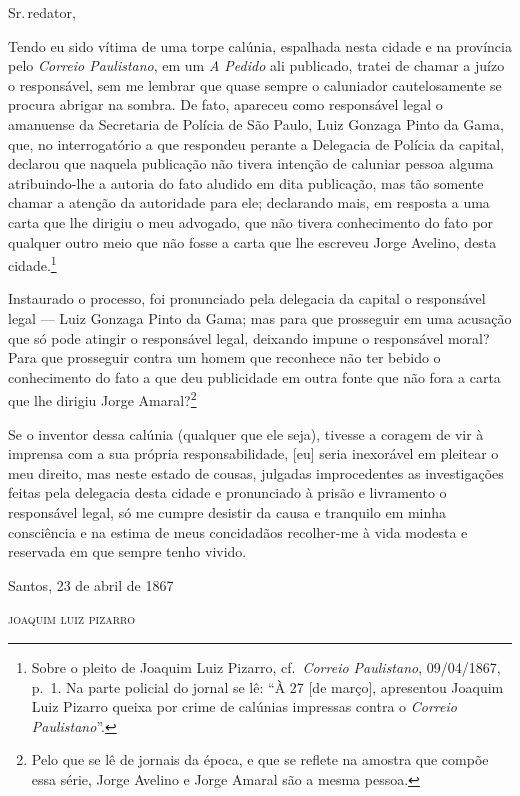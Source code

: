 Sr.\,redator,

Tendo eu sido vítima de uma torpe calúnia, espalhada nesta cidade e na
província pelo \emph{Correio Paulistano}, em um \emph{A Pedido} ali
publicado, tratei de chamar a juízo o responsável, sem me lembrar que
quase sempre o caluniador cautelosamente se procura abrigar na sombra.
De fato, apareceu como responsável legal o amanuense da Secretaria de
Polícia de São Paulo, Luiz Gonzaga Pinto da Gama, que, no interrogatório
a que respondeu perante a Delegacia de Polícia da capital, declarou que
naquela publicação não tivera intenção de caluniar pessoa alguma
atribuindo-lhe a autoria do fato aludido em dita publicação, mas tão
somente chamar a atenção da autoridade para ele; declarando mais, em
resposta a uma carta que lhe dirigiu o meu advogado, que não tivera
conhecimento do fato por qualquer outro meio que não fosse a carta que
lhe escreveu Jorge Avelino, desta cidade.\footnote{ Sobre o pleito de
  Joaquim Luiz Pizarro, cf.~\emph{Correio Paulistano}, 09/04/1867, p.~1.
  Na parte policial do jornal se lê: ``À 27 {[}de março{]}, apresentou
  Joaquim Luiz Pizarro queixa por crime de calúnias impressas contra o
  \emph{Correio Paulistano}''.}

Instaurado o processo, foi pronunciado pela delegacia da capital o
responsável legal --- Luiz Gonzaga Pinto da Gama; mas para que
prosseguir em uma acusação que só pode atingir o responsável legal,
deixando impune o responsável moral? Para que prosseguir contra um homem
que reconhece não ter bebido o conhecimento do fato a que deu
publicidade em outra fonte que não fora a carta que lhe dirigiu Jorge
Amaral?\footnote{ Pelo que se lê de jornais da época, e que se
  reflete na amostra que compõe essa série, Jorge Avelino e Jorge Amaral
  são a mesma pessoa.}

Se o inventor dessa calúnia (qualquer que ele seja), tivesse a coragem
de vir à imprensa com a sua própria responsabilidade, {[}eu{]} seria
inexorável em pleitear o meu direito, mas neste estado de cousas,
julgadas improcedentes as investigações feitas pela delegacia desta
cidade e pronunciado à prisão e livramento o responsável legal, só me
cumpre desistir da causa e tranquilo em minha consciência e na estima de
meus concidadãos recolher-me à vida modesta e reservada em que sempre
tenho vivido.

\begin{flushright}
Santos, 23 de abril de 1867

\textsc{joaquim luiz pizarro}
\end{flushright}

